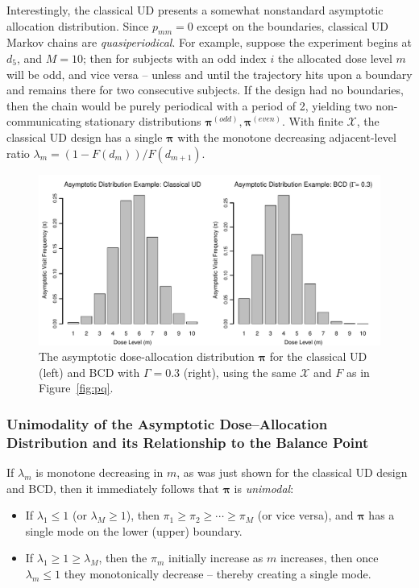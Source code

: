 Interestingly, the classical UD presents a somewhat nonstandard asymptotic allocation distribution. Since $p_{mm}=0$ except on the boundaries, classical UD Markov chains are \emph{quasiperiodical}. For example, suppose the experiment begins at $d_5$, and $M=10$; then for subjects with an odd index $i$ the allocated dose level $m$ will be odd, and vice versa -- unless and until the trajectory hits upon a boundary and remains there for two consecutive subjects. If the design had no boundaries, then the chain would be purely periodical with a period of 2, yielding two non-communicating stationary distributions $\boldsymbol{\pi}^{(odd)},\boldsymbol{\pi}^{(even)}$. With finite $\mathcal{X}$, the classical UD design has a single $\boldsymbol{\pi}$ with the monotone decreasing adjacent-level ratio $\lambda_m=\left(1-F(d_m)\right)/F(d_{m+1})$.

\begin{figure}
\begin{center}
\includegraphics[scale=0.55]{pifig}
\caption{The asymptotic dose-allocation distribution $\boldsymbol{\pi}$ for the classical UD (left) and BCD with $\Gamma=0.3$ (right), using the same $\mathcal{X}$ and $F$ as in Figure~\ref{fig:pq}.}\label{fig:pi}
\end{center}
\end{figure}

\subsubsection{Unimodality of the Asymptotic Dose--Allocation Distribution and its Relationship to the Balance Point}\label{sec:modeloc}

 If $\lambda_m$ is monotone decreasing in $m$, as was just shown for the classical UD design and BCD, then it immediately follows that $\boldsymbol{\pi}$ is \emph{unimodal}:

\begin{itemize}
\item  If $\lambda_1\leq 1$ (or $\lambda_M\geq 1$), then $\pi_1\geq\pi_2\geq\cdots\geq\pi_M$ (or vice versa), and $\boldsymbol{\pi}$ has a single mode on the lower (upper) boundary.
\item If $\lambda_1\geq 1\geq\lambda_M$, then the $\pi_m$ initially increase as $m$ increases, then once $\lambda_m\leq 1$ they monotonically decrease -- thereby creating a single mode.
\end{itemize}

